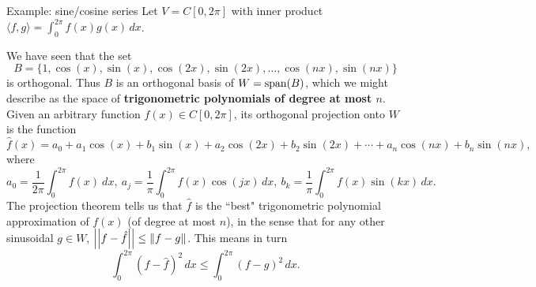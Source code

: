 %
\begin{frame}{Example: sine/cosine series}
Let $V=C[0,2\pi]$ with inner product $\langle f, g\rangle=\int_0^{2\pi}f(x)g(x) \, dx$. 

We have seen that the set
\[
B=\{1, \cos(x),\sin(x),\cos(2x),\sin(2x), \dots , \cos(nx),\sin(nx)\} 
\] 
is orthogonal. Thus $B$ is an orthogonal basis of $W=\operatorname{span}(B)$, which we might describe as the space of {\bf trigonometric polynomials of degree at most $n$}. 
\bpause
Given an arbitrary function $f(x)\in C[0,2\pi]$, its orthogonal projection onto $W$ is the function 
\[
\hat{f}(x)=a_0+a_1\cos(x)+b_1\sin(x)+a_2\cos(2x)+b_2\sin(2x)+\cdots +a_n\cos(nx)+b_n\sin(nx),
\]
where 
\[
a_0=\frac{1}{2\pi}\int_0^{2\pi} f(x) \ dx, \ a_j=\frac{1}{\pi}\int_0^{2\pi}f(x)\cos(jx)\, dx, \ b_k=\frac{1}{\pi}\int_0^{2\pi}f(x)\sin(kx)\, dx.
\]
\pause
The projection theorem tells us that $\hat{f}$ is the ``best" trigonometric polynomial approximation of $f(x)$ (of degree at most $n$), in the sense that for any other sinusoidal $g\in W$, $\left\vert\left\vert f-\hat{f}\right\vert\right\vert\leq \left\lVert f-g\right\rVert$.  
\bpause 
This means in turn 
\[
\int_0^{2\pi} (f-\hat{f})^2\, dx\leq \int_0^{2\pi} (f-g)^2 \, dx.
\]
\end{frame}
